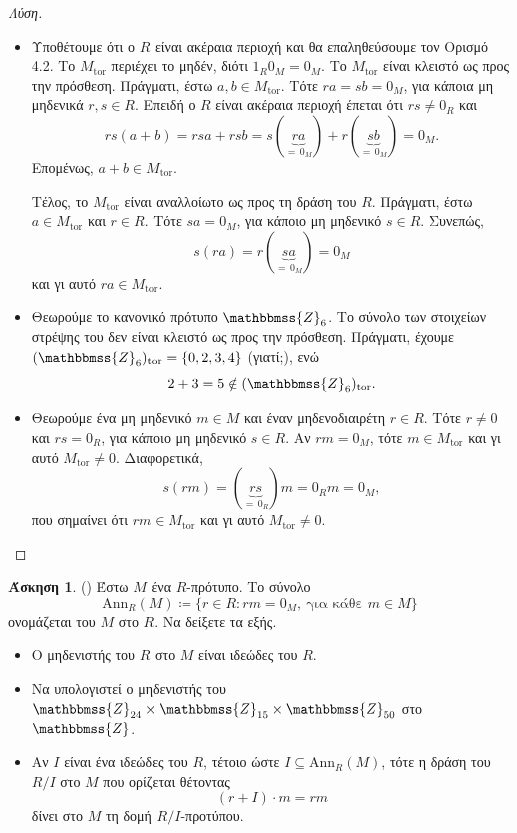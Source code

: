\documentclass[12pt,a4paper,reqno]{amsart}
\theoremstyle{definition}
\newtheorem{exercise}{Άσκηση}
\newcommand{\ZZ}{\mathbbmss{Z}}
\newcommand{\tor}{\mathrm{tor}}
\newcommand{\Ann}{\mathrm{Ann}}
\newcommand{\defn}[1]{{\color{mylightblue}{#1}}}
\begin{document}
\begin{proof}[Λύση]
  \leavevmode
  \begin{itemize}
    \item[(α)] Υποθέτουμε ότι ο $R$ είναι ακέραια περιοχή και θα επαληθεύσουμε τον Ορισμό 4.2. Το $M_\tor$ περιέχει το μηδέν, διότι $1_R0_M = 0_M$. Το $M_\tor$ είναι κλειστό ως προς την πρόσθεση. Πράγματι, έστω $a, b \in M_\tor$. Τότε $ra = sb = 0_M$, για κάποια μη μηδενικά $r, s \in R$. Επειδή ο $R$ είναι ακέραια περιοχή έπεται ότι $rs \neq 0_R$ και 
    \[
    rs(a+b) = rsa + rsb = s(\underbrace{ra}_{= \, 0_M}) + r(\underbrace{sb}_{= \, 0_M}) = 0_M.
    \]
    Επομένως, $a + b \in M_\tor$. 

    Τέλος, το $M_\tor$ είναι αναλλοίωτο ως προς τη δράση του $R$. Πράγματι, έστω $a \in M_\tor$ και $r \in R$. Τότε $sa = 0_M$, για κάποιο μη μηδενικό $s \in R$. Συνεπώς, 
    \[
    s(ra) = r(\underbrace{sa}_{= \, 0_M}) = 0_M
    \]
    και γι αυτό $ra \in M_\tor$.
    \item[(β)] Θεωρούμε το κανονικό πρότυπο $\ZZ_6$. Το σύνολο των στοιχείων στρέψης του δεν είναι κλειστό ως προς την πρόσθεση. Πράγματι, έχουμε $(\ZZ_6)_\tor = \{0, 2, 3, 4 \}$ (γιατί;), ενώ
    \[
    2 + 3 = 5 \notin (\ZZ_6)_\tor.
    \]
    \item[(γ)] Θεωρούμε ένα μη μηδενικό $m \in M$ και έναν μηδενοδιαιρέτη $r \in R$. Τότε $r \neq 0$ και $rs = 0_R$, για κάποιο μη μηδενικό $s \in R$. Αν $rm = 0_M$, τότε $m \in M_\tor$ και γι αυτό $M_\tor \neq 0$. Διαφορετικά, 
    \[
    s(rm) = (\underbrace{rs}_{= \, 0_R})m = 0_Rm = 0_M,
    \]
    που σημαίνει ότι $rm \in M_\tor$ και γι αυτό $M_\tor \neq 0$.
  \end{itemize}
\end{proof}

\begin{exercise}{\rm(\cite[Ασκήσεις~10.1.9~και~10.1.11]{DF04})}
  \label{ex:DF_10.1.9-10.1.11}
  Έστω $M$ ένα $R$-πρότυπο. Το σύνολο 
  \[
  \Ann_R(M) \coloneqq \{r \in R : rm = 0_M, \ \text{για κάθε $m \in M$}\}
  \]
  ονομάζεται \defn{μηδενιστής} του $M$ στο $R$. Να δείξετε τα εξής.
  \begin{itemize}
    \item[(α)] Ο μηδενιστής του $R$ στο $M$ είναι ιδεώδες του $R$.
    \item[(β)] Να υπολογιστεί ο μηδενιστής του $\ZZ_{24}\times\ZZ_{15}\times\ZZ_{50}$ στο $\ZZ$.
    \item[(γ)] Αν $I$ είναι ένα ιδεώδες του $R$, τέτοιο ώστε $I \subseteq \Ann_R(M)$, τότε η δράση του $R/I$ στο $M$ που ορίζεται θέτοντας 
    \[
    (r + I)\cdot{m} = rm
    \]
    δίνει στο $M$ τη δομή $R/I$-προτύπου.
  \end{itemize}
\end{exercise}
\end{document}
